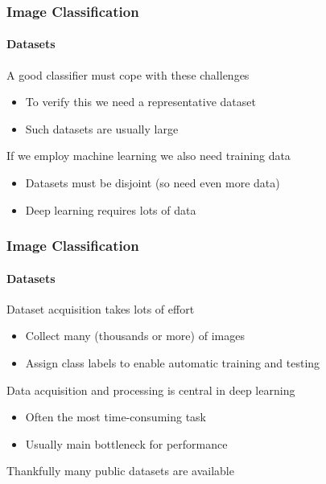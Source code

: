 \documentclass[xetex,professionalfont]{beamer}
\renewcommand\emph[1]{\textcolor{tuwcvl_cvl_blue}{#1}}
\begin{document}
\begin{frame}
\frametitle{Image Classification}
\framesubtitle{Datasets}

A good classifier must cope with these challenges
\begin{itemize}
    \item To verify this we need a representative dataset %
    \item Such datasets are usually large
\end{itemize}

\bigskip

If we employ \emph{machine learning} we also need training data
\begin{itemize}
    \item Datasets must be disjoint (so need even more data) %
    \item Deep learning requires lots of data
\end{itemize}

\end{frame}


\begin{frame}
\frametitle{Image Classification}
\framesubtitle{Datasets}

Dataset acquisition takes lots of effort
\begin{itemize}
    \item Collect many (thousands or more) of images
    \item Assign class labels to enable automatic training and testing
\end{itemize}

\bigskip

Data acquisition and processing is central in deep learning
\begin{itemize}
    \item Often the most time-consuming task
    \item Usually main bottleneck for performance
\end{itemize}

\bigskip

Thankfully many public datasets are available

\end{frame}
\end{document}
